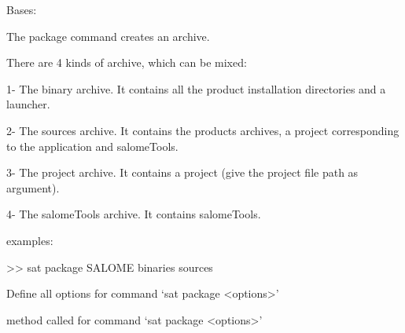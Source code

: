 \documentclass[a4paper,10pt,english]{sphinxmanual}
\begin{document}
\begin{fulllineitems}
\label{\detokenize{apidoc_commands/commands:commands.package.Command}}
Bases: 

The package command creates an archive.

\begin{DUlineblock}{0em}
\item[] There are 4 kinds of archive, which can be mixed:
\item[] 1- The binary archive. It contains all the product installation directories and a launcher.
\item[] 2- The sources archive. It contains the products archives, a project corresponding to the application and salomeTools.
\item[] 3- The project archive. It contains a project (give the project file path as argument).
\item[] 4- The salomeTools archive. It contains salomeTools.
\item[] 
\item[] examples:
\item[] \textgreater{}\textgreater{} sat package SALOME \textendash{}binaries \textendash{}sources
\end{DUlineblock}

\begin{fulllineitems}
\label{\detokenize{apidoc_commands/commands:commands.package.Command.getParser}}
Define all options for command ‘sat package \textless{}options\textgreater{}’

\end{fulllineitems}


\begin{fulllineitems}
\label{\detokenize{apidoc_commands/commands:commands.package.Command.name}}
\end{fulllineitems}


\begin{fulllineitems}
\label{\detokenize{apidoc_commands/commands:commands.package.Command.run}}
method called for command ‘sat package \textless{}options\textgreater{}’

\end{fulllineitems}


\end{fulllineitems}
\end{document}
